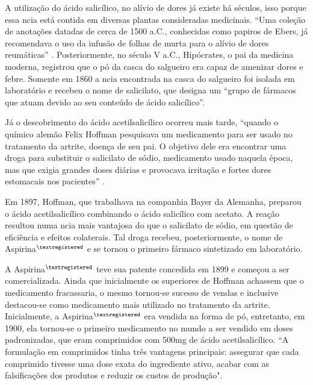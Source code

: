 A utilização do ácido salicílico, no alívio de dores já existe há séculos, isso porque essa ncia está
contida em diversas plantas consideradas medicinais. “Uma coleção de anotações datadas de cerca de 1500
a.C., conhecidas como papiros de Ebers, já recomendava o uso da infusão de folhas de murta para o alívio
de dores reumáticas” \cite{aspirinabayer}. Posteriormente, no século V a.C., Hipócrates, o pai da medicina
moderna, registrou que o pó da casca do salgueiro era capaz de amenizar dores e febre. Somente em 1860 a
ncia encontrada na casca do salgueiro foi isolada em laboratório e recebeu o nome de salicilato, que
designa um “grupo de fármacos que atuam devido ao seu conteúdo de ácido salicílico”. \cite{Goodman2005}

Já o descobrimento do ácido acetilsalicílico ocorreu mais tarde, “quando o químico alemão
Felix Hoffman pesquisava um medicamento para ser usado no tratamento da artrite, doença de seu pai. O
objetivo dele era encontrar uma droga para substituir o salicilato de sódio, medicamento usado naquela
época, mas que exigia grandes doses diárias e provocava irritação e fortes dores estomacais nos pacientes”
\cite{massabni2006}.

Em 1897, Hoffman, que trabalhava na companhia Bayer da Alemanha, preparou o ácido
acetilsalicílico combinando o ácido salicílico com acetato. A reação resultou numa ncia mais vantajosa do
que o salicilato de sódio, em questão de eficiência e efeitos colaterais. Tal droga recebeu,
posteriormente, o nome de Aspirina$^{\tiny{\textregistered}}$ e se tornou o primeiro fármaco sintetizado
em laboratório.  

A Aspirina$^{\tiny{\textregistered}}$ teve sua patente concedida em 1899 e começou a ser comercializada.
Ainda que inicialmente os superiores de Hoffman achassem que o medicamento fracassaria, o mesmo tornou-se
sucesso de vendas e inclusive destacou-se como medicamento mais utilizado no tratamento da artrite.
Inicialmente, a Aspirina$^{\tiny{\textregistered}}$
era vendida na forma de pó, entretanto, em 1900, ela tornou-se o primeiro medicamento no mundo a ser
vendido em doses padronizadas, que eram comprimidos com 500mg de ácido acetilsalicílico. “A formulação em
comprimidos tinha três vantagens principais: assegurar que cada comprimido tivesse uma dose exata do
ingrediente ativo, acabar com as falsificações dos produtos e reduzir os custos de
produção".\cite{aspirinabayer}

